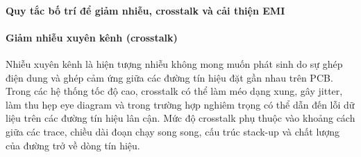                 \paragraph{Quy tắc bố trí để giảm nhiễu, crosstalk và cải thiện EMI}
                    \paragraph{Giảm nhiễu xuyên kênh (crosstalk)}
                        Nhiễu xuyên kênh là hiện tượng nhiễu không mong muốn phát sinh do sự ghép điện dung và ghép cảm ứng giữa các đường tín hiệu đặt gần nhau trên PCB. Trong các hệ thống tốc độ cao, crosstalk có thể làm méo dạng xung, gây jitter, làm thu hẹp eye diagram và trong trường hợp nghiêm trọng có thể dẫn đến lỗi dữ liệu trên các đường tín hiệu lân cận. Mức độ crosstalk phụ thuộc vào khoảng cách giữa các trace, chiều dài đoạn chạy song song, cấu trúc stack-up và chất lượng của đường trở về dòng tín hiệu. 
                        
                        

